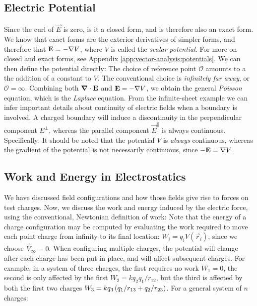 \subsection{Electric Potential}	
Since the curl of $\vec{E}$ is zero, is it a closed form, and is therefore also an exact form. We know that exact forms are the exterior derivatives of simpler forms, and therefore that $\boldsymbol{\mathbf{E}} = -\nabla V$, where $V$ is called the \textit{scalar potential}. For more on closed and exact forms, see Appendix \ref{app:vector-analysis:potentials}. 
We can then define the potential directly:
The choice of reference point $\mathcal{O}$ amounts to a the addition of a constant to $V$. The conventional choice is \textit{infinitely far away}, or $\mathcal{O}=\infty$. Combining both $\boldsymbol{\mathbf{\nabla}}\cdot \boldsymbol{\mathbf{E}}$ and $\boldsymbol{\mathbf{E}}=-\nabla V$, we obtain the general \textit{Poisson} equation, which is the \textit{Laplace} equation.
From the infinite-sheet example we can infer important details about continuity of electric fields when a boundary is involved. A charged boundary will induce a discontinuity in the perpendicular component $E^{\perp}$, whereas the parallel component $\vec{E}^{\parallel}$ is always continuous. Specifically:
It should be noted that the potential $V$ is \textit{always} continuous, whereas the gradient of the potential is not necessarily continuous, since $-\boldsymbol{\mathbf{E}} = \nabla V$.
\subsection{Work and Energy in Electrostatics}
We have discussed field configurations and how those fields give rise to forces on test charges. Now, we discuss the work and energy induced by the electric force, using the conventional, Newtonian definition of work:
Note that the energy of a charge configuration may be computed by evaluating the work required to move each point charge from infinity to its final location: $W_i = q_i V(\vec{r}_i)$, since we choose $\vec{V}_{\infty}=0$.
When configuring multiple charges, the potential will change after each charge has been put in place, and will affect subsequent charges. For example, in a system of three charges, the first requires no work $W_1=0$, the second is only affected by the first $W_2 = k q_2 q_1 / r_{12}$, but the third is affected by both the first two charges $W_3 = k q_3 \left(q_1 / r_{13} + q_2 / r_{23}\right)$. For a general system of $n$ charges:
